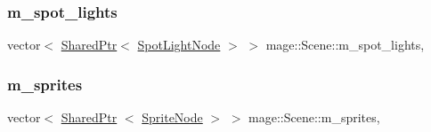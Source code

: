 \hypertarget{classmage_1_1_scene_a4e1954bc0b812d6a71123ca3ac9eeb75}{}\label{classmage_1_1_scene_a4e1954bc0b812d6a71123ca3ac9eeb75} 
\subsubsection{\texorpdfstring{m\+\_\+spot\+\_\+lights}{m\_spot\_lights}}
{\footnotesize\ttfamily vector$<$ \hyperlink{namespacemage_a1e01ae66713838a7a67d30e44c67703e}{Shared\+Ptr}$<$ \hyperlink{namespacemage_aeed5dee4ff6c591eabb0e9114256df4a}{Spot\+Light\+Node} $>$ $>$ mage\+::\+Scene\+::m\+\_\+spot\+\_\+lights\hspace{0.3cm}{\ttfamily [mutable]}, {\ttfamily [private]}}

\hypertarget{classmage_1_1_scene_a2d68edf08b57dde36ec7cf1f5a91d281}{}\label{classmage_1_1_scene_a2d68edf08b57dde36ec7cf1f5a91d281} 
\subsubsection{\texorpdfstring{m\+\_\+sprites}{m\_sprites}}
{\footnotesize\ttfamily vector$<$ \hyperlink{namespacemage_a1e01ae66713838a7a67d30e44c67703e}{Shared\+Ptr} $<$ \hyperlink{classmage_1_1_sprite_node}{Sprite\+Node} $>$ $>$ mage\+::\+Scene\+::m\+\_\+sprites\hspace{0.3cm}{\ttfamily [mutable]}, {\ttfamily [private]}}

